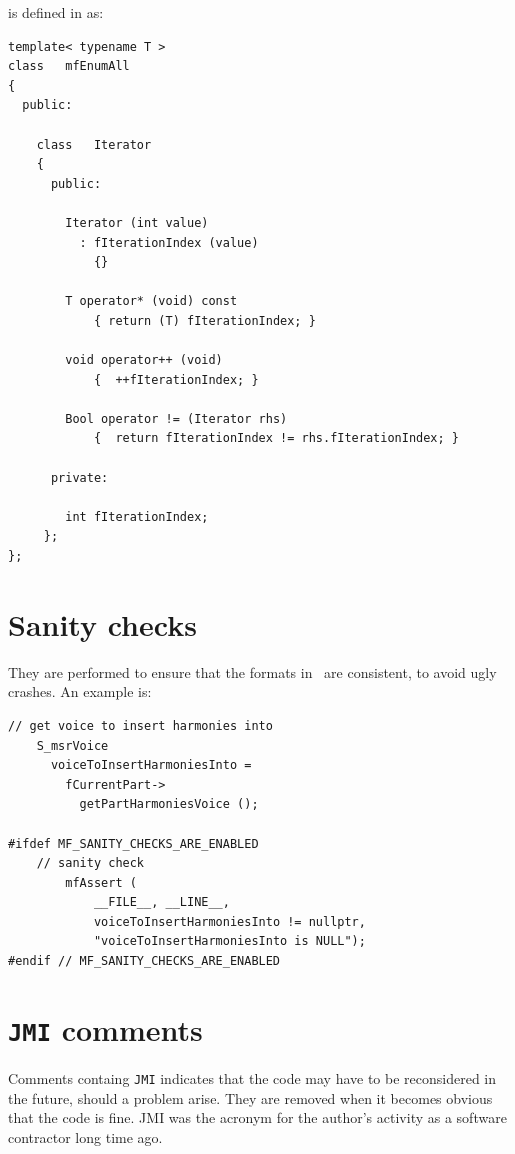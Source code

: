 \newpage

 is defined in  as:
\begin{lstlisting}[language=CPlusPlus]
template< typename T >
class   mfEnumAll
{
  public:

    class   Iterator
    {
      public:

        Iterator (int value)
          : fIterationIndex (value)
            {}

        T operator* (void) const
            { return (T) fIterationIndex; }

        void operator++ (void)
            {  ++fIterationIndex; }

        Bool operator != (Iterator rhs)
            {  return fIterationIndex != rhs.fIterationIndex; }

      private:

        int fIterationIndex;
     };
};
\end{lstlisting}


\section{Sanity checks}

They are performed to ensure that the formats in \mf\ are consistent, to avoid ugly crashes. An example is:
\begin{lstlisting}[language=CPlusPlus]
    // get voice to insert harmonies into
    S_msrVoice
      voiceToInsertHarmoniesInto =
        fCurrentPart->
          getPartHarmoniesVoice ();

#ifdef MF_SANITY_CHECKS_ARE_ENABLED
  	// sanity check
		mfAssert (
			__FILE__, __LINE__,
			voiceToInsertHarmoniesInto != nullptr,
			"voiceToInsertHarmoniesInto is NULL");
#endif // MF_SANITY_CHECKS_ARE_ENABLED
\end{lstlisting}


\section{{\tt JMI} comments}

Comments containg {\tt JMI} indicates that the code may have to be reconsidered in the future, should a problem arise. They are removed when it becomes obvious that the code is fine. JMI was the acronym for the author's activity as a software contractor long time ago.


